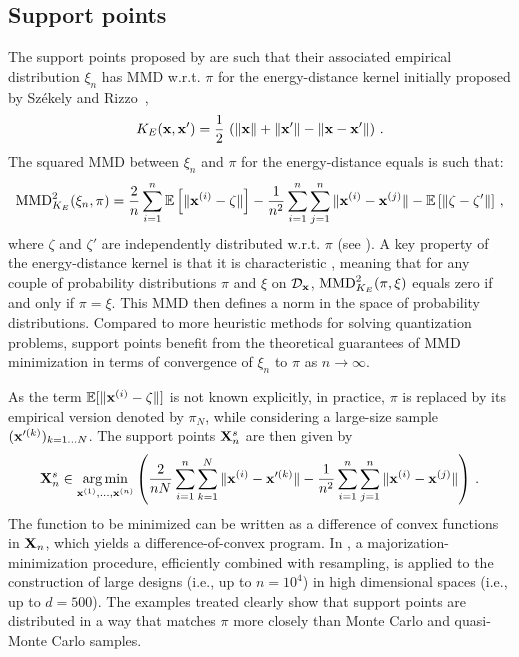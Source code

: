 \subsection{Support points}\label{sec:SP}
The support points proposed by \citet{mak_joseph_2018} are such that their associated empirical distribution $\xi_n$ has MMD w.r.t. $\pi$ for the energy-distance kernel initially proposed by Sz\'ekely and Rizzo~\citep{szekely_rizzo_2013},
\begin{equation}\label{eq:kE}
K_E({\bf x},{\bf x}') = \frac12\, \left(\Vert {\bf x} \Vert + \Vert {\bf x}' \Vert - \Vert {\bf x}-{\bf x}' \Vert\right)\,.
\end{equation} 
The squared MMD between $\xi_n$ and $\pi$ for the energy-distance equals is such that:
\begin{equation}\label{eq:energySP}
\mathrm{MMD}_{K_E}^2(\xi_n,\pi) = \frac{2}{n} \sum_{i=1}^{n} \mathbb{E} \left[ \|{\bf x}^{(i)}-\zeta\|\right] - \frac{1}{n^2} \sum_{i=1}^{n}\sum_{j=1}^{n} \|{\bf x}^{(i)}-{\bf x}^{(j)} \| - \mathbb{E} \left[\|\zeta-\zeta'\|\right] \,,
\end{equation}
where $\zeta$ and $\zeta'$ are independently distributed w.r.t. $\pi$ (see \citealp{sejdinovic_2013}).
A key property of the energy-distance kernel is that it is characteristic \citep{sriperumbudur_2010}, meaning that for any couple of probability distributions $\pi$ and $\xi$ on $\mathcal{D}_{\bf x}$, $\mathrm{MMD}_{K_E}^2(\pi,\xi)$ equals zero if and only if $\pi=\xi$. 
This MMD then defines a norm in the space of probability distributions.
Compared to more heuristic methods for solving quantization problems, support points benefit from the theoretical guarantees of MMD minimization in terms of convergence of $\xi_n$ to $\pi$ as $n\to\infty$. 

As the term $\mathbb{E}[\|{\bf x}^{(i)}-\zeta\|]$ is not known explicitly, in practice, $\pi$ is replaced by its empirical version denoted by $\pi_N$, while considering a large-size sample $({\bf x}'^{(k)})_{k=1\ldots N}$. 
The support points ${\bf X}_n^s$ are then given by
\begin{equation}\label{eq:SPestim}
{\bf X}_n^s \in \operatorname*{arg\,min}_{{\bf x}^{(1)},\ldots,{\bf x}^{(n)}} \left( \frac{2}{n N} \sum_{i=1}^{n} \sum_{k=1}^N \|{\bf x}^{(i)}-{\bf x}'^{(k)}\| - \frac{1}{{n}^2} \sum_{i=1}^{n}\sum_{j=1}^{n} \|{\bf x}^{(i)}-{\bf x}^{(j)}\| \right) \,.
\end{equation}
The function to be minimized can be written as a difference of convex functions in ${\bf X}_n$, which yields a difference-of-convex program. 
In \citet{mak_joseph_2018}, a majorization-minimization procedure, efficiently combined with resampling, is applied to the construction of large designs (i.e., up to $n=10^4$) in high dimensional spaces (i.e., up to $d=500$). 
The examples treated clearly show that support points are distributed in a way that matches $\pi$ more closely than Monte Carlo and quasi-Monte Carlo samples.

